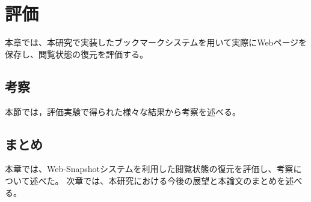 \chapter{評価}
\label{chap:evaluation}
本章では、本研究で実装したブックマークシステムを用いて実際にWebページを保存し、閲覧状態の復元を評価する。




\section{考察}
本節では，評価実験で得られた様々な結果から考察を述べる。

\section{まとめ}
本章では、Web-Snapshotシステムを利用した閲覧状態の復元を評価し、考察について述べた。
次章では、本研究における今後の展望と本論文のまとめを述べる。